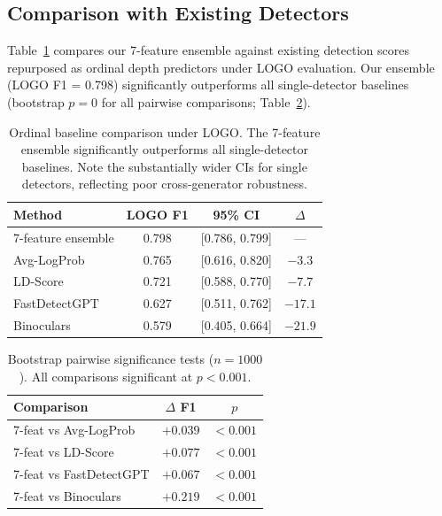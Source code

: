 \documentclass[11pt]{article}
\begin{document}
\subsection{Comparison with Existing Detectors}
\label{sec:baselines}

Table~\ref{tab:baselines} compares our 7-feature ensemble against existing detection scores repurposed as ordinal depth predictors under LOGO evaluation. Our ensemble (LOGO F1 = 0.798) significantly outperforms all single-detector baselines (bootstrap $p = 0$ for all pairwise comparisons; Table~\ref{tab:bootstrap}).

\begin{table}[t]
\centering
\small
\begin{tabular}{lccc}
\toprule
\textbf{Method} & \textbf{LOGO F1} & \textbf{95\% CI} & \textbf{$\Delta$} \\
\midrule
7-feature ensemble & 0.798 & [0.786, 0.799] & --- \\
Avg-LogProb & 0.765 & [0.616, 0.820] & $-3.3$ \\
LD-Score & 0.721 & [0.588, 0.770] & $-7.7$ \\
FastDetectGPT & 0.627 & [0.511, 0.762] & $-17.1$ \\
Binoculars & 0.579 & [0.405, 0.664] & $-21.9$ \\
\bottomrule
\end{tabular}
\caption{Ordinal baseline comparison under LOGO. The 7-feature ensemble significantly outperforms all single-detector baselines. Note the substantially wider CIs for single detectors, reflecting poor cross-generator robustness.}
\label{tab:baselines}
\end{table}

\begin{table}[t]
\centering
\small
\begin{tabular}{lcc}
\toprule
\textbf{Comparison} & \textbf{$\Delta$ F1} & \textbf{$p$} \\
\midrule
7-feat vs Avg-LogProb & $+0.039$ & $< 0.001$ \\
7-feat vs LD-Score & $+0.077$ & $< 0.001$ \\
7-feat vs FastDetectGPT & $+0.067$ & $< 0.001$ \\
7-feat vs Binoculars & $+0.219$ & $< 0.001$ \\
\bottomrule
\end{tabular}
\caption{Bootstrap pairwise significance tests ($n = 1000$). All comparisons significant at $p < 0.001$.}
\label{tab:bootstrap}
\end{table}
\end{document}
